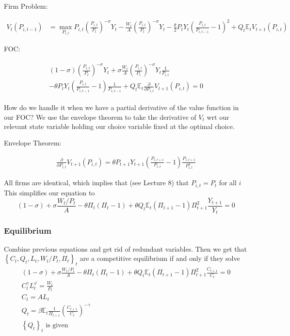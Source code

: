 \documentclass[10pt]{article}
\begin{document}
Firm Problem:

\begin{align}
        V_t\left(P_{i, t-1}\right) & =\max _{P_{i, t}} P_{i, t}\left(\frac{P_{i, t}}{P_t}\right)^{-\sigma} Y_t-\frac{W_t}{A}\left(\frac{P_{i, t}}{P_t}\right)^{-\sigma} Y_t-\frac{\theta}{2} P_t Y_t\left(\frac{P_{i, t}}{P_{i, t-1}}-1\right)^2 
        +Q_t \mathbb{E}_t V_{t+1}\left(P_{i, t}\right)
\end{align}

FOC:

\begin{align}
    \begin{gathered}
        (1-\sigma)\left(\frac{P_{i, t}}{P_t}\right)^{-\sigma} Y_t+\sigma \frac{W_t}{A}\left(\frac{P_{i, t}}{P_t}\right)^{-\sigma} Y_t \frac{1}{P_{i, t}} \\
        -\theta P_t Y_t\left(\frac{P_{i, t}}{P_{i, t-1}}-1\right) \frac{1}{P_{i, t-1}}+Q_t \mathbb{E}_t \frac{\partial}{\partial P_{i, t}} V_{t+1}\left(P_{i, t}\right)=0
        \end{gathered}
\end{align}

How do we handle it when we have a partial derivative of the value function 
in our FOC? We use the envelope theorem to take the derivative 
of $V_t$ wrt our relevant state variable holding our choice variable 
fixed at the optimal choice.

Envelope Theorem:

\begin{align}
    \frac{\partial}{\partial P_{i, t}} V_{t+1}\left(P_{i, t}\right)=\theta P_{t+1} Y_{t+1}\left(\frac{P_{i, t+1}}{P_{i, t}}-1\right) \frac{P_{i, t+1}}{P_{i, t}^2}
\end{align}

All firms are identical, which implies that (see Lecture 8) that $P_{i, t}=P_t$ for all $i$
This simplifies our equation to
$$
(1-\sigma)+\sigma \frac{W_t / P_t}{A}-\theta \Pi_t\left(\Pi_t-1\right)+\theta Q_t \mathbb{E}_t\left(\Pi_{t+1}-1\right) \Pi_{t+1}^2 \frac{Y_{t+1}}{Y_t}=0
$$

\subsubsection{Equilibrium}

Combine previous equations and get rid of redundant variables. Then we get that 
$\left\{C_t, Q_t, L_t, W_t / P_t, \Pi_t\right\}_t$ are a competitive equilibrium if and only if they solve
$$
\begin{gathered}
(1-\sigma)+\sigma \frac{W_t / P_t}{A}-\theta \Pi_t\left(\Pi_t-1\right)+\theta Q_t \mathbb{E}_t\left(\Pi_{t+1}-1\right) \Pi_{t+1}^2 \frac{C_{t+1}}{C_t}=0 \\
C_t^\gamma L_t^{\varphi}=\frac{W_t}{P_t} \\
C_t=A L_t \\
Q_t=\beta \mathbb{E}_t \frac{1}{\Pi_{t+1}}\left(\frac{C_{t+1}}{C_t}\right)^{-\gamma} \\
\left\{Q_t\right\}_t \text { is given }
\end{gathered}
$$
\end{document}
